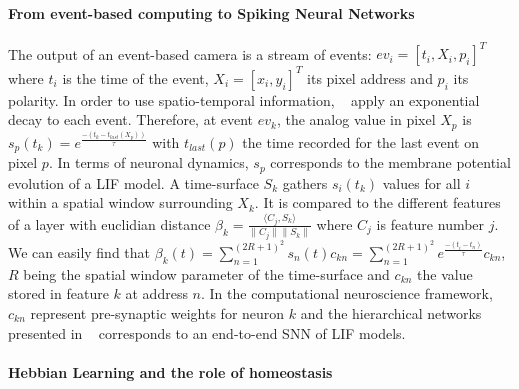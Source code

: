 \documentclass[12pt]{article}
\newcommand{\citep}[1]{\parencite{#1}}
\begin{document}
\paragraph*{From event-based computing to Spiking Neural Networks}
The output of an event-based camera is a stream of events: $ev_i = [t_i,X_i,p_i]^T$ where $t_i$ is the time of the event, $X_i=[x_i,y_i]^T$ its pixel address and $p_i$ its polarity. In order to use spatio-temporal information, ~\citep{Lagorce17} apply an exponential decay to each event. Therefore, at event $ev_k$, the analog value in pixel $X_p$ is $s_p(t_k) = e^\frac{-(t_k-t_{last}(X_p))}{\tau}$ with $t_{last}(p)$ the time recorded for the last event on pixel $p$. In terms of neuronal dynamics, $s_p$ corresponds to the membrane potential evolution of a LIF model. A time-surface $S_k$ gathers $s_i(t_k)$ values for all $i$ within a spatial window surrounding $X_k$. It is compared to the different features of a layer with euclidian distance $ \beta_k = \frac{\langle C_j,S_k\rangle}{\|C_j\|\|S_k\|}$ where $C_j$ is feature number $j$. We can easily find that $ \beta_k(t) = \sum_{n=1}^{(2R+1)^2}s_{n}(t)c_{kn} = \sum_{n=1}^{(2R+1)^2}e^\frac{-(t_i-t_n)}{\tau}c_{kn}$, $R$ being the spatial window parameter of the time-surface and $c_{kn}$ the value stored in feature $k$ at address $n$. In the computational neuroscience framework, $c_{kn}$ represent pre-synaptic weights for neuron $k$ and the hierarchical networks presented in ~\citep{Lagorce17} corresponds to an end-to-end SNN of LIF models. 

\paragraph*{Hebbian Learning and the role of homeostasis}
\end{document}
